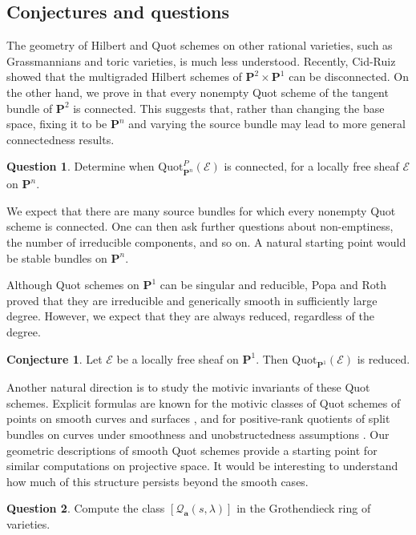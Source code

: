 \documentclass[leqno,11pt,a4paper]{amsart}
\theoremstyle{definition}
\newtheorem{conj}[conj]{Conjecture}
\newtheorem{question}[question]{Question}
\numberwithin{equation}{section}
\newcommand{\bfa}{\mathbf{a}}
\newcommand{\Quot}{\mathrm{Quot}}
\newcommand{\PP}{\mathbf{P}}
\newcommand{\EE}{\mathscr{E}}
\newcommand{\QQ}{\mathcal{Q}}
\begin{document}
\subsection{Conjectures and questions}
The geometry of Hilbert and Quot schemes on other rational varieties, such as Grassmannians and toric varieties, is much less understood. 
Recently, Cid-Ruiz \cite{CidRuiz26} showed that the multigraded Hilbert schemes of $\PP^2 \times \PP^1$ can be disconnected. 
On the other hand, we prove in  that every nonempty Quot scheme of the tangent bundle
of $\PP^2$ is connected. 
This suggests that, rather than changing the base space, fixing it to be $\PP^n$ and varying the source bundle may lead to more general connectedness results.

\begin{question}
Determine when $\Quot_{\PP^n}^P(\EE)$ is connected, for a locally free sheaf $\EE$ on $\PP^n$. 
\end{question}
We expect that there are many source bundles for which every nonempty Quot scheme is connected. One can then ask further questions about non-emptiness, the number of irreducible components, and so on. 
A natural starting point would be stable bundles on $\PP^n$.

Although Quot schemes on $\PP^1$ can be singular and reducible, Popa and Roth \cite[Theorem~6.4]{PopaRoth} proved that they are irreducible and generically smooth in sufficiently large degree.
However, we expect that they are always reduced, regardless of the degree. 

\begin{conj}
Let $\EE$ be a locally free sheaf on $\PP^1$.  Then $\Quot_{\PP^1}(\EE)$ is reduced.
\end{conj}

Another natural direction is to study the motivic invariants of these Quot schemes. 
Explicit formulas are known for the motivic classes of Quot schemes of points on smooth curves and surfaces \cite{BFP20,Moz19}, and for positive-rank quotients of split bundles on curves under smoothness and unobstructedness assumptions \cite{MR25}.
Our geometric descriptions of smooth Quot schemes provide a starting point for similar computations on projective space.
It would be interesting to understand how much of this structure persists beyond the smooth cases.

\begin{question}
Compute the class $[\QQ_{\bfa}(s,\lambda)]$ in the Grothendieck ring of varieties.
\end{question}
\end{document}
